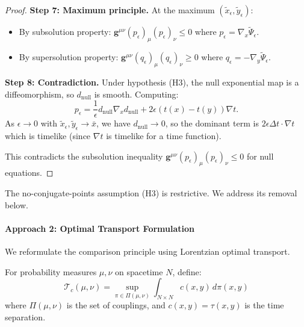 \begin{proof}
\textbf{Step 7: Maximum principle.} At the maximum $(\tilde{x}_\epsilon, \tilde{y}_\epsilon)$:
\begin{itemize}
    \item By subsolution property: $\mathbf{g}^{\mu\nu}(p_\epsilon)_\mu(p_\epsilon)_\nu \leq 0$ where $p_\epsilon = \nabla_x\tilde{\Psi}_\epsilon$.
    \item By supersolution property: $\mathbf{g}^{\mu\nu}(q_\epsilon)_\mu(q_\epsilon)_\nu \geq 0$ where $q_\epsilon = -\nabla_y\tilde{\Psi}_\epsilon$.
\end{itemize}

\textbf{Step 8: Contradiction.} Under hypothesis (H3), the null exponential map is a diffeomorphism, so $d_{\text{null}}$ is smooth. Computing:
\begin{equation}
    p_\epsilon = \frac{1}{\epsilon}d_{\text{null}}\nabla_x d_{\text{null}} + 2\epsilon(t(x) - t(y))\nabla t.
\end{equation}
As $\epsilon \to 0$ with $\tilde{x}_\epsilon, \tilde{y}_\epsilon \to \bar{x}$, we have $d_{\text{null}} \to 0$, so the dominant term is $2\epsilon\Delta t \cdot \nabla t$ which is timelike (since $\nabla t$ is timelike for a time function).

This contradicts the subsolution inequality $\mathbf{g}^{\mu\nu}(p_\epsilon)_\mu(p_\epsilon)_\nu \leq 0$ for null equations.
\end{proof}

\begin{remark}[Hypothesis (H3)]
The no-conjugate-points assumption (H3) is restrictive. We address its removal below.
\end{remark}

\paragraph{Approach 2: Optimal Transport Formulation}

We reformulate the comparison principle using Lorentzian optimal transport.

\begin{definition}
For probability measures $\mu, \nu$ on spacetime $N$, define:
\begin{equation}
    \mathcal{T}_c(\mu, \nu) = \sup_{\pi \in \Pi(\mu, \nu)} \int_{N \times N} c(x, y) \, d\pi(x, y)
\end{equation}
where $\Pi(\mu, \nu)$ is the set of couplings, and $c(x, y) = \tau(x, y)$ is the time separation.
\end{definition}

